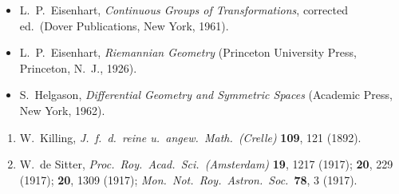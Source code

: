 

\begin{itemize}
  \item[\(\square\)] L.~P.~Eisenhart,
  \emph{Continuous Groups of Transformations}, corrected ed.\
  (Dover Publications, New York, 1961).

  \item[\(\square\)] L.~P.~Eisenhart,
  \emph{Riemannian Geometry}
  (Princeton University Press, Princeton, N.~J., 1926).

  \item[\(\square\)] S.~Helgason,
  \emph{Differential Geometry and Symmetric Spaces}
  (Academic Press, New York, 1962).
\end{itemize}

\begin{enumerate}
  \item{}\label{ch13-ref-1}
  W.~Killing, \emph{J.\ f.\ d.\ reine u.\ angew.\ Math.\ (Crelle)}
  \textbf{109}, 121 (1892).

  \item{}\label{ch13-ref-2}
  W.~de Sitter, \emph{Proc.\ Roy.\ Acad.\ Sci.\ (Amsterdam)}
  \textbf{19}, 1217 (1917);
  \textbf{20}, 229 (1917);
  \textbf{20}, 1309 (1917);
  \emph{Mon.\ Not.\ Roy.\ Astron.\ Soc.}\ \textbf{78}, 3 (1917).
\end{enumerate}
